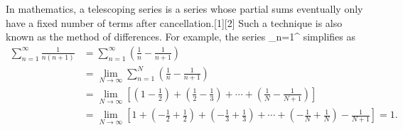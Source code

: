 In mathematics, a telescoping series is a series whose partial sums eventually only have a fixed number of terms after cancellation.[1][2] Such a technique is also known as the method of differences.
For example, the series
\sum_{n=1}^\infty{}
simplifies as
\begin{align}
\sum_{n=1}^\infty \frac{1}{n(n+1)} & {} = \sum_{n=1}^\infty \left( \frac{1}{n} - \frac{1}{n+1} \right) \\
{} & {} = \lim_{N\to\infty} \sum_{n=1}^N \left( \frac{1}{n} - \frac{1}{n+1} \right) \\
{} & {} = \lim_{N\to\infty} \left\lbrack {\left(1 - \frac{1}{2}\right) + \left(\frac{1}{2} - \frac{1}{3}\right) + \cdots + \left(\frac{1}{N} - \frac{1}{N+1}\right) } \right\rbrack  \\
{} & {} = \lim_{N\to\infty} \left\lbrack {  1 + \left( - \frac{1}{2} + \frac{1}{2}\right) + \left( - \frac{1}{3} + \frac{1}{3}\right) + \cdots + \left( - \frac{1}{N} + \frac{1}{N}\right) - \frac{1}{N+1} } \right\rbrack = 1.
\end{align}
